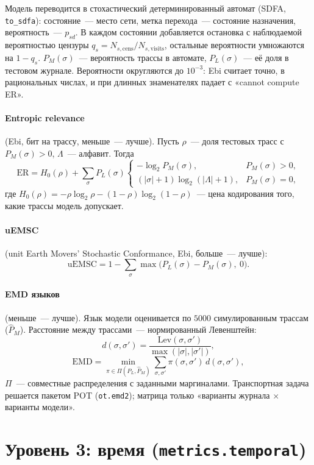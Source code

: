 \documentclass[11pt,a4paper]{article}
\newcommand{\code}[1]{\texttt{#1}}
\newcommand{\1}{\mathbf{1}}
\begin{document}
Модель переводится в стохастический детерминированный автомат (SDFA, \code{to\_sdfa}):
состояние~--- место сети, метка перехода~--- состояние назначения, вероятность~--- $p_{sd}$.
В каждом состоянии добавляется остановка с наблюдаемой вероятностью цензуры
$q_s=N_{s,\mathrm{cens}}/N_{s,\mathrm{visits}}$, остальные вероятности умножаются на $1-q_s$.
$P_M(\sigma)$~--- вероятность трассы в автомате, $P_L(\sigma)$~--- её доля в тестовом журнале.
Вероятности округляются до $10^{-3}$: Ebi считает точно, в рациональных числах, и при
длинных знаменателях падает с «cannot compute ER».

\paragraph{Entropic relevance} (Ebi, бит на трассу, меньше~--- лучше). Пусть $\rho$~---
доля тестовых трасс с $P_M(\sigma)>0$, $\Lambda$~--- алфавит. Тогда
\[
\mathrm{ER}=H_0(\rho)+\sum_\sigma P_L(\sigma)
\begin{cases}
-\log_2 P_M(\sigma), & P_M(\sigma)>0,\\
(|\sigma|+1)\log_2(|\Lambda|+1), & P_M(\sigma)=0,
\end{cases}
\]
где $H_0(\rho)=-\rho\log_2\rho-(1-\rho)\log_2(1-\rho)$~--- цена кодирования того, какие трассы модель допускает.

\paragraph{uEMSC} (unit Earth Movers' Stochastic Conformance, Ebi, больше~--- лучше):
\[
\mathrm{uEMSC}=1-\sum_\sigma\max\bigl(P_L(\sigma)-P_M(\sigma),\ 0\bigr).
\]

\paragraph{EMD языков} (меньше~--- лучше). Язык модели оценивается по $5000$ симулированным
трассам ($\hat P_M$). Расстояние между трассами~--- нормированный Левенштейн:
\[
d(\sigma,\sigma')=\frac{\mathrm{Lev}(\sigma,\sigma')}{\max(|\sigma|,|\sigma'|)},
\]
\[
\mathrm{EMD}=\min_{\pi\in\Pi(P_L,\hat P_M)}\sum_{\sigma,\sigma'}\pi(\sigma,\sigma')\,d(\sigma,\sigma'),
\]
$\Pi$~--- совместные распределения с заданными маргиналами. Транспортная задача решается
пакетом POT (\code{ot.emd2}); матрица только «варианты журнала $\times$ варианты модели».

\section{Уровень 3: время (\code{metrics.temporal})}
\end{document}

